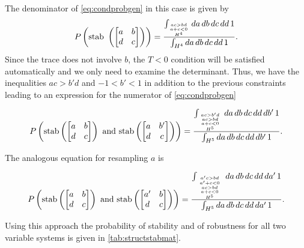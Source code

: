 The denominator of \ref{eq:condprobgen} in this case is given by
\begin{align*}
P\left(\textrm{stab } \left( \begin{bmatrix}
a & b \\
d & c
\end{bmatrix} \right) \right) = \frac{\int_{\genfrac{}{}{0pt}{}{\genfrac{}{}{0pt}{}{ac>bd}{a+c<0}}{H^4}} da\,db\,dc\,dd\,1}{\int_{H^4} da\,db\,dc\,dd\,1}.
\end{align*}
Since the trace does not involve $b$, the $T<0$ condition will be satisfied automatically and we only need to examine the determinant. Thus, we have the inequalities $ac > b'd$ and $-1 < b' < 1$ in addition to the previous constraints leading to an expression for the numerator of \ref{eq:condprobgen}
\begin{widetext}
\begin{align*}
P\left(\textrm{stab} \left( \begin{bmatrix}
a & b \\
d & c
\end{bmatrix} \right) \textrm{ and stab} \left( \begin{bmatrix}
a & b' \\
d & c
\end{bmatrix} \right) \right) = \frac{\int_{{{ac>b'd \atop ac>bd} \atop a+c<0} \atop H^5} da\,db\,dc\,dd\,db'\,1}{\int_{H^5} da\,db\,dc\,dd\,db'\,1}.
\end{align*}
\end{widetext}
The analogous equation for resampling $a$ is
\begin{widetext}
\begin{align*}
P\left(\textrm{stab} \left( \begin{bmatrix}
a & b \\
d & c
\end{bmatrix} \right) \textrm{ and stab} \left( \begin{bmatrix}
a' & b \\
d & c
\end{bmatrix} \right) \right) = \frac{\int_{{{{a'c>bd \atop a' + c < 0} \atop ac>bd} \atop a+c<0} \atop H^5} da\,db\,dc\,dd\,da'\,1}{\int_{H^5} da\,db\,dc\,dd\,da'\,1}.
\end{align*}
\end{widetext}
Using this approach the probability of stability and of robustness for all two variable systems is given in \ref{tab:structstabmat}.

